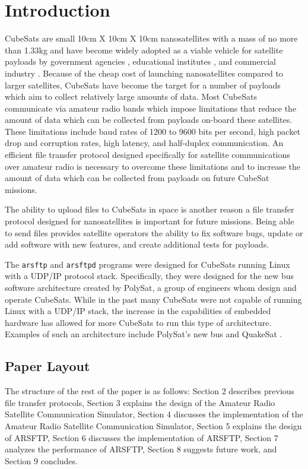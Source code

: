 \documentclass[journal]{./IEEEtran}
\begin{document}
\section{Introduction}

CubeSats are small 10cm X 10cm X 10cm nanosatellites with a mass of no more than 1.33kg and have become widely adopted as a viable vehicle for satellite payloads by government agencies \cite{ELaNa}, educational institutes \cite{UniversityTokyoCubeSat}, and commercial industry \cite{LockheedFlorida}.   Because of the cheap cost of launching nanosatellites compared to larger satellites, CubeSats have become the target for a number of payloads which aim to collect relatively large amounts of data.  Most CubeSats communicate via amateur radio bands which impose limitations that reduce the amount of data which can be collected from payloads on-board these satellites.  These limitations include baud rates of 1200 to 9600 bits per second, high packet drop and corruption rates, high latency, and half-duplex communication.  An efficient file transfer protocol designed specifically for satellite communications over amateur radio is necessary to overcome these limitations and to increase the amount of data which can be collected from payloads on future CubeSat missions.

The ability to upload files to CubeSats in space is another reason a file transfer protocol designed for nanosatellites is important for future missions.  Being able to send files provides satellite operators the ability to fix software bugs, update or add software with new features, and create additional tests for payloads.  

The {\tt arsftp} and {\tt arsftpd} programs were designed for CubeSats running Linux with a UDP/IP protocol stack.  Specifically, they were designed for the new bus software architecture created by PolySat, a group of engineers whom design and operate CubeSats.  While in the past many CubeSats were not capable of running Linux with a UDP/IP stack, the increase in the capabilities of embedded hardware has allowed for more CubeSats to run this type of architecture. Examples of such an architecture include PolySat’s new bus \cite{PolySatDampening} and QuakeSat \cite{QuakeSat}.

\subsection{Paper Layout}
The structure of the rest of the paper is as follows: Section 2 describes previous file transfer protocols, Section 3 explains the design of the Amateur Radio Satellite Communication Simulator, Section 4 discusses the implementation of the Amateur Radio Satellite Communication Simulator, Section 5 explains the design of ARSFTP, Section 6 discusses the implementation of ARSFTP, Section 7 analyzes the performance of ARSFTP, Section 8 suggests future work, and Section 9 concludes.
\end{document}
